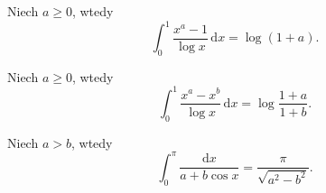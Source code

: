 \begin{integral}
    Niech $a \ge 0$, wtedy
    \begin{equation}
        \int_0^1 \frac{x^a - 1}{\log x} \,\mathrm{d}x = \log(1+a).
    \end{equation}
\end{integral}

\begin{integral}
    Niech $a \ge 0$, wtedy
    \begin{equation}
        \int_0^1 \frac{x^a - x^b}{\log x} \,\mathrm{d}x = \log \frac{1+a}{1+b}.
    \end{equation}
\end{integral}

\begin{integral}
    Niech $a > b$, wtedy
    \begin{equation}
        \int_0^\pi \frac{\mathrm{d}x} {a + b \cos x} = \frac{\pi}{\sqrt{a^2 - b^2}}.
    \end{equation}
\end{integral}

%